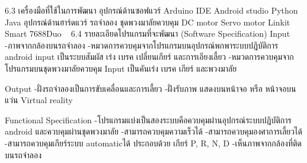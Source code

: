 6.3 เครื่องมือที่ใช้ในการพัฒนา
อุปกรณ์ด้านซอฟแวร์
	Arduino IDE
	Android studio
	Python  
	Java 
	อุปกรณ์ด้านฮาร์ดแวร์
	รถจำลอง
	ชุดพวงมาลัยควบคุม
	DC motor
	Servo motor
	Linkit Smart 7688Duo 
 
6.4 รายละเอียดโปรแกรมที่จะพัฒนา (Software Specification) 
Input 
	-ภาพจากกล้องบนรถจำลอง
	-หมวดการควบคุมจากโปรแกรมบนอุปกรณ์พกพาระบบปฎิบัติการ android 
	input เป็นระบบสัมผัส เร่ง เบรค เปลี่ยนเกียร์ และการเอียงเลี้ยว
	-หมวดการควบคุมจากโปรแกรมบนชุดพวงมาลัยควบคุม
	Input เป็นคันเร่ง เบรค เกียร์ และพวงมาลัย

Output 
	-ฝั่งรถจำลองเป็นการขับเคลื่อนและการเลี้ยว
	-ฝั่งรับภาพ แสดงบนหน้าจอ หรือ หน้าจอบนแว่น Virtual reality



        	        
Functional Specification
	-โปรแกรมแบ่งเป็นสองระบบคือควบคุมผ่านอุปกรณ์ระบบปฎิบัติการ android และควบคุมผ่านชุดพวงมาลัย
	-สามารถควบคุมความเร็วได้
	-สามารถควบคุมองศาการเลี้ยวได้
	-สามารถควบคุมเกียร์ระบบ automaticได้ ประกอบด้วย เกียร์ P, R, N, D
	-เห็นภาพจากกล้องที่ติดบนรถจำลอง

